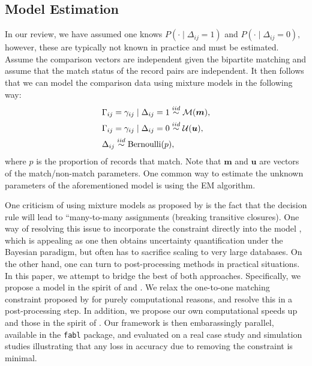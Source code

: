 \documentclass[12pt,letterpaper]{article}
\newcommand{\1}[1]{\mathbb{I}\!\left[#1\right]} %
\begin{document}
\subsection{Model Estimation}
In our review, we have assumed one knows $P(\cdot \mid \Delta_{ij} = 1)$ and $P(\cdot \mid \Delta_{ij} = 0),$ however, these are typically not known in practice and must be estimated. Assume the comparison vectors are independent given the bipartite matching and assume that the match status of the record pairs are independent. It then follows that we can model 
the comparison data using mixture models in the following way:
\begin{align}
&\Gamma_{ij} = \gamma_{ij} \mid \Delta_{ij} = 1 \stackrel{iid}{\sim} \mathcal{M}(\bm{m}), \\
&\Gamma_{ij} = \gamma_{ij} \mid \Delta_{ij} = 0  \stackrel{iid}{\sim} \mathcal{U}(\bm{u}), \notag\\
& \Delta_{ij}   \stackrel{iid}{\sim} \text{Bernoulli}(p), \notag
\end{align}
where $p$ is the proportion of records that match. Note that $\bm{m}$ and $\bm{u}$ are vectors of the match/non-match parameters. One common way to estimate the unknown parameters of the aforementioned model is using the EM algorithm. 

One criticism of using mixture models as proposed by \cite{jaro1989} is the fact that the decision rule will lead to ``many-to-many assignments (breaking transitive closures). One way of resolving this issue to incorporate the constraint directly into the model \citep{Fortinietal01, Matsakis10, liseo_jos_2011, liseo_2011, Larsen05, Larsen12, gutman_bayesian_2013, sadinle_bayesian_2017}, which is appealing as one then obtains uncertainty quantification under the Bayesian paradigm, but often has to sacrifice scaling to very large databases. On the other hand, one can turn to post-processing methods in practical situations. In this paper, we attempt to bridge the best of both approaches. Specifically, we propose a model in the spirit of \cite{sadinle_bayesian_2017} and \cite{enamorado_using_2019}. We relax the one-to-one matching constraint proposed by  \cite{sadinle_bayesian_2017} for purely computational reasons, and resolve this in a post-processing step. In addition, we propose our own computational speeds up and those in the spirit of \cite{enamorado_using_2019}. Our framework is then embarassingly parallel, available in the \texttt{fabl} package, and evaluated on a real case study and simulation studies illustrating that any loss in accuracy due to removing the constraint is minimal. 
\end{document}
